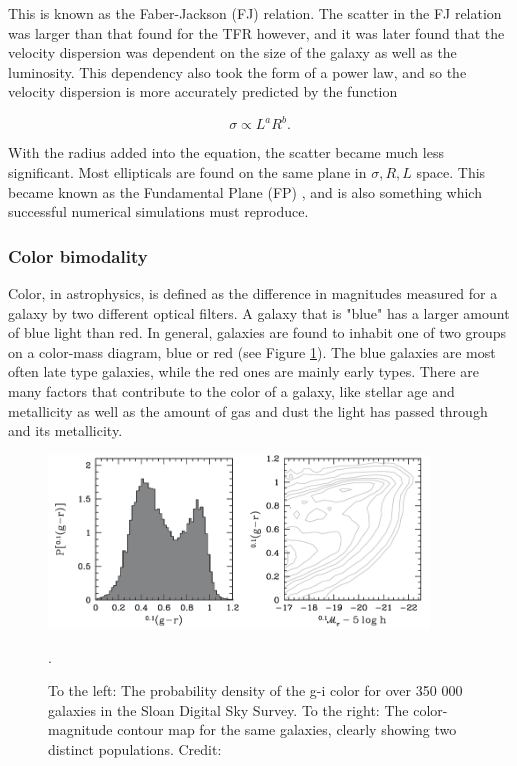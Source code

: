 This is known as the Faber-Jackson (FJ) relation. The scatter in the FJ relation was larger than that found for the TFR however, and it was later found that the velocity dispersion was dependent on the size of the galaxy as well as the luminosity. This dependency also took the form of a power law, and so the velocity dispersion is more accurately predicted by the function

\begin{equation}
    \sigma \propto L^a R^b.
\end{equation}

With the radius added into the equation, the scatter became much less significant. Most ellipticals are found on the same plane in ${\sigma, R, L}$ space. This became known as the Fundamental Plane (FP) \parencite{Djorgovski1987}, and is also something which successful numerical simulations must reproduce.

\subsubsection{Color bimodality}
Color, in astrophysics, is defined as the difference in magnitudes measured for a galaxy by two different optical filters. A galaxy that is "blue" has a larger amount of blue light than red. In general, galaxies are found to inhabit one of two groups on a color-mass diagram, blue or red (see Figure \ref{color_bimodality}). The blue galaxies are most often late type galaxies, while the red ones are mainly early types. There are many factors that contribute to the color of a galaxy, like stellar age and metallicity as well as the amount of gas and dust the light has passed through and its metallicity.

\begin{figure}
    \centering
    \includegraphics[width=0.9\textwidth]{images/color_bimodality.png}
    \caption{To the left: The probability density of the g-i color for over 350 000 galaxies in the Sloan Digital Sky Survey. To the right: The color-magnitude contour map for the same galaxies, clearly showing two distinct populations. Credit: \textcite{Mo2010}}.
    \label{color_bimodality}
\end{figure}
